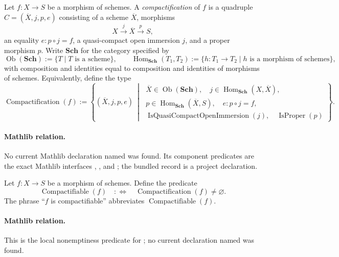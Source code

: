 \begin{definition}[Compactification] \checked
  \label{def:nagata-compactification}
  \lean{}

  Let $f\colon X\to S$ be a morphism of schemes.  A \emph{compactification}
  of $f$ is a quadruple $C=(\overline X,j,p,e)$ consisting of a scheme
  $\overline X$, morphisms
  \[
    X\xrightarrow{j}\overline X\xrightarrow{p}S,
  \]
  an equality $e\colon p\circ j=f$, a quasi-compact open immersion $j$, and
  a proper morphism $p$.
  Write $\mathbf{Sch}$ for the category specified by
  \[
    \operatorname{Ob}(\mathbf{Sch})
      :=\{T\mid T\text{ is a scheme}\},\qquad
    \operatorname{Hom}_{\mathbf{Sch}}(T_1,T_2)
      :=\{h\colon T_1\to T_2\mid h\text{ is a morphism of schemes}\},
  \]
  with composition and identities equal to composition and identities of
  morphisms of schemes.  Equivalently, define the type
  \[
    \operatorname{Compactification}(f)
      :=\left\{(\overline X,j,p,e)\ \middle|\;
      \begin{array}{l}
        \overline X\in\operatorname{Ob}(\mathbf{Sch}),\quad
        j\in\operatorname{Hom}_{\mathbf{Sch}}(X,\overline X),\\
        p\in\operatorname{Hom}_{\mathbf{Sch}}(\overline X,S),\quad
        e\colon p\circ j=f,\\
        \operatorname{IsQuasiCompactOpenImmersion}(j),\quad
        \operatorname{IsProper}(p)
      \end{array}\right\}.
  \]

  \paragraph{Mathlib relation.}
  No current Mathlib declaration named
  \texttt{} was found.  Its
  component predicates are the exact Mathlib interfaces
  \texttt{},
  \texttt{}, and
  \texttt{}; the bundled record is a project
  declaration.
\end{definition}

\begin{definition}[Compactifiability]
  \label{def:nagata-compactifiable}
  \lean{}

  Let \(f\colon X\to S\) be a morphism of schemes.  Define the predicate
  \[
    \operatorname{Compactifiable}(f)
      \quad:\Longleftrightarrow\quad
    \operatorname{Compactification}(f)\neq\varnothing.
  \]
  The phrase ``$f$ is compactifiable'' abbreviates
  $\operatorname{Compactifiable}(f)$.

  \paragraph{Mathlib relation.}
  This is the local nonemptiness predicate for
  ; no current declaration named
  \texttt{} was found.
\end{definition}

